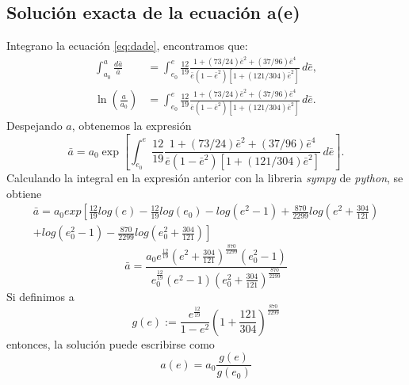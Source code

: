 \subsection{Solución exacta de la ecuación a(e)}
Integrano la ecuación \ref{eq:dade}, encontramos que:
\begin{align*}
    \int_{a_{0}}^{a}\frac{d\bar{a}}{\bar{a}}&=\int_{e_{0}}^{e}\frac{12}{19}\frac{1+(73/24)\bar{e}^2+(37/96)\bar{e}^4}{\bar{e}(1-\bar{e}^2)[1+(121/304)\bar{e}^2]}\,d\bar{e},\\
    \ln \left(\frac{a}{a_{0}}\right)&=\int_{e_{0}}^{e}\frac{12}{19}\frac{1+(73/24)\bar{e}^2+(37/96)\bar{e}^4}{\bar{e}(1-\bar{e}^2)[1+(121/304)\bar{e}^2]}\,d\bar{e}.
\end{align*}
Despejando $a$, obtenemos la expresión
\begin{equation}
    \bar{a}= a_{0}\exp\left[\int_{e_{0}}^{e}\frac{12}{19}\frac{1+(73/24)\bar{e}^2+(37/96)\bar{e}^4}{\bar{e}(1-\bar{e}^2)[1+(121/304)\bar{e}^2]}\,d\bar{e}\right].
    \label{eq:bara}
\end{equation}
Calculando la integral en la expresión anterior con la libreria \textit{sympy} de \textit{python}, se obtiene
\begin{eqnarray*}
        \bar{a}=a_0exp\left[\frac{12}{19}log(e)-\frac{12}{19}log(e_0)-log(e^2-1)+\frac{870}{2299}log\left(e^2+\frac{304}{121}\right)\right.\\
        \left.+log\left(e^2_0-1\right)-\frac{870}{2299}log\left(e^2_0+\frac{304}{121}\right)\right]
\end{eqnarray*}
\begin{equation}
    \bar{a}= \frac{a_0e^{\frac{12}{19}}\left(e^2+\frac{304}{121}\right)^{\frac{870}{2299}}\left(e^2_0-1\right)}{e^{\frac{12}{19}}_0\left(e^2-1\right)\left(e_0^2+\frac{304}{121}\right)^{\frac{870}{2299}}}
\end{equation}
Si definimos a 
\begin{equation}
    g(e):= \frac{e^{\frac{12}{19}}}{1-e^2} \left(1+\frac{121}{304}\right)^{\frac{870}{2299}}
    \label{eq:g(e)}
\end{equation}
entonces, la solución puede escribirse como 
\begin{equation}
    a(e)= a_0\frac{g(e)}{g(e_0)}
    \label{eq:a(e)}
\end{equation}
